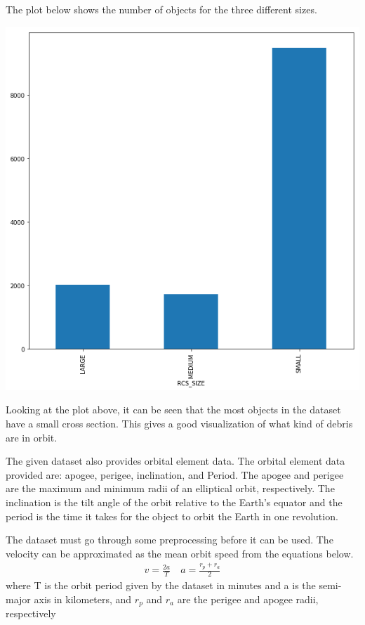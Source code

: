 \documentclass[12pt,a4paper]{article}
\begin{document}
The plot below shows the number of objects for the three different sizes.
\begin{center}
	\includegraphics[scale=0.25]{figures/RCS_size.png}
	\label{fig:RCS_size}
\end{center}
Looking at the plot above, it can be seen that the most objects in the dataset have a small cross section. This gives a good visualization of what kind of debris are in orbit.

The given dataset also provides orbital element data. The orbital element data provided are: apogee, perigee, inclination, and Period. The apogee and perigee are the maximum and minimum radii of an elliptical orbit, respectively. The inclination is the tilt angle of the orbit relative to the Earth's equator and the period is the time it takes for the object to orbit the Earth in one revolution. 

The dataset must go through some preprocessing before it can be used. The velocity can be approximated as the mean orbit speed from the equations below\cite{Curtis}.
\begin{equation}
\begin{matrix}
v = \frac{2a}{T} \quad a = \frac{r_p + r_a }{2}
\end{matrix}
\end{equation}
where T is the orbit period given by the dataset in minutes and a is the semi-major axis in kilometers, and $r_p$ and $r_a$ are the perigee and apogee radii, respectively
\end{document}

